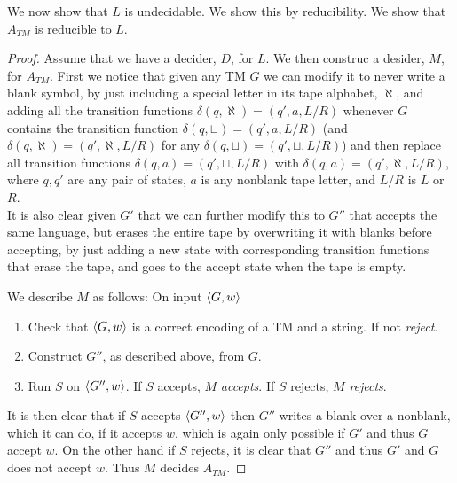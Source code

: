 \documentclass[a4paper,11pt]{article}
\numberwithin{equation}{section}
\begin{document}
We now show that $ L $ is undecidable. We show this by reducibility. We show that $ A_{TM} $ is reducible to $ L $.\begin{proof}
	Assume that we have a decider, $ D $, for $ L $. We then construc a desider, $ M $, for $ A_{TM} $. First we notice that given any TM $ G $ we can modify it to never write a blank symbol, by just including a special letter in its tape alphabet, $ \aleph $, and adding all the transition functions $ \delta(q,\aleph)=(q',a,L/R) $ whenever $ G $ contains the transition function $ \delta(q,\sqcup)=(q',a,L/R) $ (and $ \delta(q,\aleph)=(q',\aleph,L/R) $ for any $ \delta(q,\sqcup)=(q',\sqcup,L/R) $) and then replace all transition functions $ \delta(q,a)=(q',\sqcup,L/R) $ with $ \delta(q,a)=(q',\aleph,L/R) $, where $ q,q' $ are any pair of states, $ a $ is any nonblank tape letter, and $ L/R $ is $ L $ or $ R $.\\
	It is also clear given $ G' $ that we can further modify this to $ G'' $ that accepts the same language, but erases the entire tape by overwriting it with blanks before accepting, by just adding a new state with corresponding transition functions that erase the tape, and goes to the accept state when the tape is empty.
 	
	 We describe $ M $ as follows: On input $ \braket{G,w} $\begin{enumerate}
		\item Check that $ \braket{G,w} $ is a correct encoding of a TM and a string. If not \emph{reject}.
		\item Construct $ G'' $, as described above, from $ G $.
		\item Run $ S $ on $ \braket{G'',w} $. If $ S $ accepts, $ M $ \emph{accepts}. If $ S $ rejects, $ M $ \emph{rejects}. 
	\end{enumerate}
	It is then clear that if $ S $ accepts $ \braket{G'',w} $ then $ G'' $ writes a blank over a nonblank, which it can do, if it accepts $ w $, which is again only possible if $ G' $ and thus $ G $ accept $ w $. On the other hand if $ S $ rejects, it is clear that $ G'' $ and thus $ G' $ and $ G $ does not accept $ w $. Thus $ M $ decides $ A_{TM} $.
\end{proof}
\end{document}
